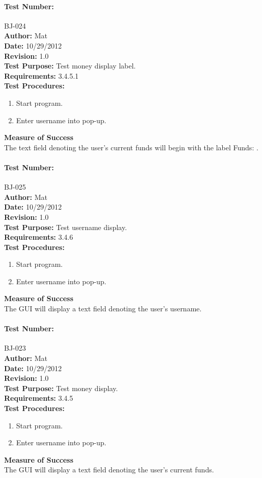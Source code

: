 \documentclass{article}
\begin{document}
\paragraph{Test Number:} BJ-024\\
\textbf{Author:} Mat\\
\textbf{Date:} 10/29/2012\\
\textbf{Revision:} 1.0\\
\textbf{Test Purpose:} Test money display label.\\
\textbf{Requirements:} 3.4.5.1 \\
\textbf{Test Procedures:} 
\begin{enumerate}
\item Start program.
\item Enter username into pop-up.
\end{enumerate}
\textbf{Measure of Success}\\The text field denoting the user's current funds will begin with the label Funds: .
\paragraph{Test Number:} BJ-025\\
\textbf{Author:} Mat\\
\textbf{Date:} 10/29/2012\\
\textbf{Revision:} 1.0\\
\textbf{Test Purpose:} Test username display.\\
\textbf{Requirements:} 3.4.6 \\
\textbf{Test Procedures:} 
\begin{enumerate}
\item Start program.
\item Enter username into pop-up.
\end{enumerate}
\textbf{Measure of Success}\\The GUI will display a text field denoting the user's username.
\paragraph{Test Number:} BJ-023\\
\textbf{Author:} Mat\\
\textbf{Date:} 10/29/2012\\
\textbf{Revision:} 1.0\\
\textbf{Test Purpose:} Test money display.\\
\textbf{Requirements:} 3.4.5 \\
\textbf{Test Procedures:} 
\begin{enumerate}
\item Start program.
\item Enter username into pop-up.
\end{enumerate}
\textbf{Measure of Success}\\The GUI will display a text field denoting the user's current funds.
\end{document}
